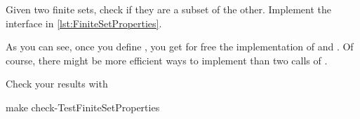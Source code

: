
\begin{codeexercise}
    Given two finite sets, check if they are a subset of the other.
    Implement the interface in \cref{lst:FiniteSetProperties}.

\end{codeexercise}


As you can see, once you define , you get for free the implementation of  and . Of course, there might be more efficient ways to implement  than two calls of .

Check your results with

\begin{console}
    make check-TestFiniteSetProperties
\end{console}
